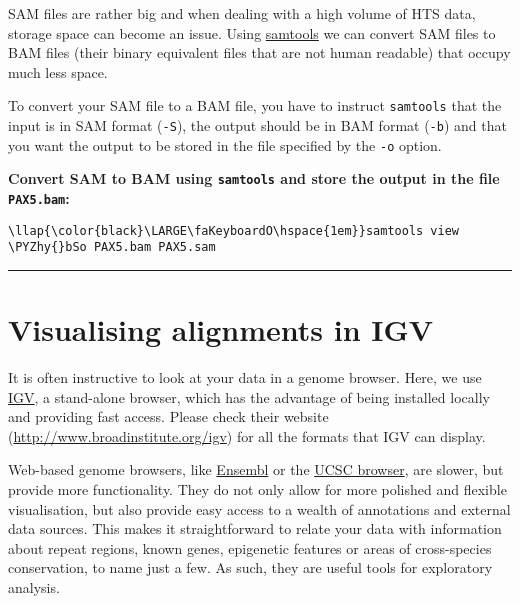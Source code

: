 \documentclass[11pt]{article}
\def\PYZhy{\char`\-}
\begin{document}
SAM files are rather big and when dealing with a high volume of HTS
data, storage space can become an issue. Using
\href{http://samtools.sourceforge.net/}{samtools} we can convert SAM
files to BAM files (their binary equivalent files that are not human
readable) that occupy much less space.

To convert your SAM file to a BAM file, you have to instruct
\texttt{samtools} that the input is in SAM format (\texttt{-S}), the
output should be in BAM format (\texttt{-b}) and that you want the
output to be stored in the file specified by the \texttt{-o} option.

    \textbf{Convert SAM to BAM using \texttt{samtools} and store the output
in the file \texttt{PAX5.bam}:}





\begin{terminalinput}
\begin{Verbatim}[commandchars=\\\{\}]
\llap{\color{black}\LARGE\faKeyboardO\hspace{1em}}samtools view \PYZhy{}bSo PAX5.bam PAX5.sam
\end{Verbatim}
\end{terminalinput}



    \begin{center}\rule{0.5\linewidth}{.4pt}\end{center}





\newpage





    \hypertarget{visualising-alignments-in-igv}{%
\section{Visualising alignments in
IGV}\label{visualising-alignments-in-igv}}

It is often instructive to look at your data in a genome browser. Here,
we use \href{http://www.broadinstitute.org/igv}{IGV}, a stand-alone
browser, which has the advantage of being installed locally and
providing fast access. Please check their website
(\url{http://www.broadinstitute.org/igv}) for all the formats that IGV
can display.

Web-based genome browsers, like \href{https://www.ensembl.org}{Ensembl}
or the \href{https://genome.ucsc.edu/cgi-bin/hgGateway}{UCSC browser},
are slower, but provide more functionality. They do not only allow for
more polished and flexible visualisation, but also provide easy access
to a wealth of annotations and external data sources. This makes it
straightforward to relate your data with information about repeat
regions, known genes, epigenetic features or areas of cross-species
conservation, to name just a few. As such, they are useful tools for
exploratory analysis.
\end{document}
